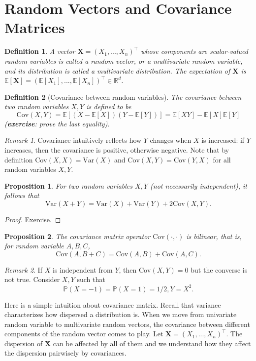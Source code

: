 \documentclass{article}
\newtheorem{definition}{Definition}
\newtheorem{proposition}{Proposition}
\DeclareMathOperator*{\1}{\mathbbm{1}}
\theoremstyle{definition}
\theoremstyle{remark}
\newtheorem{remark}{Remark}
\begin{document}
  \section{Random Vectors and Covariance Matrices}
  \begin{definition}
    A vector $\mathbf X=(X_1,...,X_n)^\top$ whose components are scalar-valued random variables is called a random vector, or a multivariate random variable, and its distribution is called a multivariate distribution. The expectation of $\mathbf X$ is $\mathbb E[\mathbf X] = (\mathbb E[X_1],...,\mathbb E[X_n])^\top\in \mathbb R^d$.
  \end{definition}
  \begin{definition}[Covariance between random variables]
    The covariance between two random variables $X,Y$ is defined to be \[\mathrm{Cov}(X,Y)=\mathbb E[(X-\mathbb E[X])(Y-\mathbb E[Y])] = \mathbb E[XY] - \mathbb E[X]\mathbb E[Y]\] (\textbf{exercise}: prove the last equality).
  \end{definition}
  \begin{remark}
    Covariance intuitively reflects how $Y$ changes when $X$ is increased: if $Y$ increases, then the covariance is positive, otherwise negative. Note that by definition $\mathrm{Cov}(X,X)=\mathrm{Var}(X)$ and $\mathrm{Cov}(X,Y)=\mathrm{Cov}(Y,X)$ for all random variables $X,Y$.
  \end{remark}
  \begin{proposition}
    For two random variables $X,Y$ (not necessarily independent), it follows that\[\mathrm{Var}(X+Y)=\mathrm{Var}(X)+\mathrm{Var}(Y)+2\mathrm{Cov}(X,Y).\]
  \end{proposition}
  \begin{proof}
    Exercise.
  \end{proof}
  \begin{proposition}
    The covariance matrix operator $\mathrm{Cov}(\cdot,\cdot)$ is bilinear, that is, for random variable $A,B,C$,
    \[\mathrm{Cov}(A,B+C)=\mathrm{Cov}(A,B)+\mathrm{Cov}(A,C).\]
  \end{proposition}
  \begin{remark}
    If $X$ is independent from $Y$, then $\mathrm{Cov}(X,Y)=0$ but the converse is not true. Consider $X,Y$ such that 
    \begin{equation*}
      \mathbb P(X=-1) = \mathbb P(X=1)=1/2, Y=X^2.
    \end{equation*}
  \end{remark}
  Here is a simple intuition about covariance matrix. Recall that variance characterizes how dispersed a distribution is. When we move from univariate random variable to multivariate random vectors, the covariance between different components of the random vector comes to play. Let $\mathbf X=(X_1,...,X_n)^\top$. The dispersion of $\mathbf X$ can be affected by all of them and we understand how they affect the dispersion pairwisely by covariances.
\end{document}
